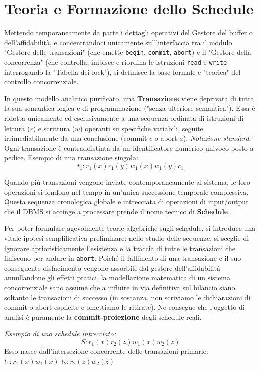 \section{Teoria e Formazione dello Schedule}

Mettendo temporaneamente da parte i dettagli operativi del Gestore del buffer o dell'affidabilità, e concentrandoci unicamente sull'interfaccia tra il modulo "Gestore delle transazioni" (che emette \texttt{begin}, \texttt{commit}, \texttt{abort}) e il "Gestore della concorrenza" (che controlla, inibisce e riordina le istruzioni \texttt{read} e \texttt{write} interrogando la "Tabella dei lock"), si definisce la base formale e "teorica" del controllo concorrenziale.

In questo modello analitico purificato, una \textbf{Transazione} viene deprivata di tutta la sua semantica logica e di programmazione ("senza ulteriore semantica"). Essa è ridotta unicamente ed esclusivamente a una sequenza ordinata di istruzioni di lettura ($r$) e scrittura ($w$) operanti su specifiche variabili, seguite irrimediabilmente da una conclusione (commit $c$ o abort $a$).
\textit{Notazione standard}: Ogni transazione è contraddistinta da un identificatore numerico univoco posto a pedice.
Esempio di una transazione singola:
$$t_1: r_1(x) r_1(y) w_1(x) w_1(y) c_1$$

Quando più transazioni vengono inviate contemporaneamente al sistema, le loro operazioni si fondono nel tempo in un'unica successione temporale complessiva.
Questa sequenza cronologica globale e intrecciata di operazioni di input/output che il DBMS si accinge a processare prende il nome tecnico di \textbf{Schedule}.

Per poter formulare agevolmente teorie algebriche sugli schedule, si introduce una vitale ipotesi semplificativa preliminare: nello studio delle sequenze, si sceglie di ignorare aprioristicamente l'esistenza e la traccia di tutte le transazioni che finiscono per andare in \texttt{abort}. Poiché il fallimento di una transazione e il suo conseguente disfacimento vengono assorbiti dal gestore dell'affidabilità annullandone gli effetti pratici, la modellazione matematica di un sistema concorrenziale sano assume che a influire in via definitiva sul bilancio siano soltanto le transazioni di successo (in sostanza, non scriviamo le dichiarazioni di commit o abort esplicite e omettiamo le ritirate). Ne consegue che l'oggetto di analisi è puramente la \textbf{commit-proiezione} degli schedule reali.

\textit{Esempio di uno schedule intrecciato:}
$$S: r_1(x) r_2(z) w_1(x) w_2(z)$$
Esso nasce dall'intersezione concorrente delle transazioni primarie:
$t_1: r_1(x) w_1(x)$
$t_2: r_2(z) w_2(z)$

